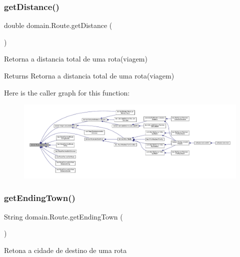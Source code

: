 \subsubsection{\texorpdfstring{get\+Distance()}{getDistance()}}
{\footnotesize\ttfamily double domain.\+Route.\+get\+Distance (\begin{DoxyParamCaption}{ }\end{DoxyParamCaption})}

Retorna a distancia total de uma rota(viagem)

\begin{DoxyReturn}{Returns}
Retorna a distancia total de uma rota(viagem) 
\end{DoxyReturn}
Here is the caller graph for this function\+:\nopagebreak
\begin{figure}[H]
\begin{center}
\leavevmode
\includegraphics[width=350pt]{classdomain_1_1_route_a39e1f65aa6930a75d8b8edb73fb06f02_icgraph}
\end{center}
\end{figure}
\mbox{\label{classdomain_1_1_route_a914f727c54adab3aa1a62f61c997dcdd}} 
\subsubsection{\texorpdfstring{get\+Ending\+Town()}{getEndingTown()}}
{\footnotesize\ttfamily String domain.\+Route.\+get\+Ending\+Town (\begin{DoxyParamCaption}{ }\end{DoxyParamCaption})}

Retona a cidade de destino de uma rota

